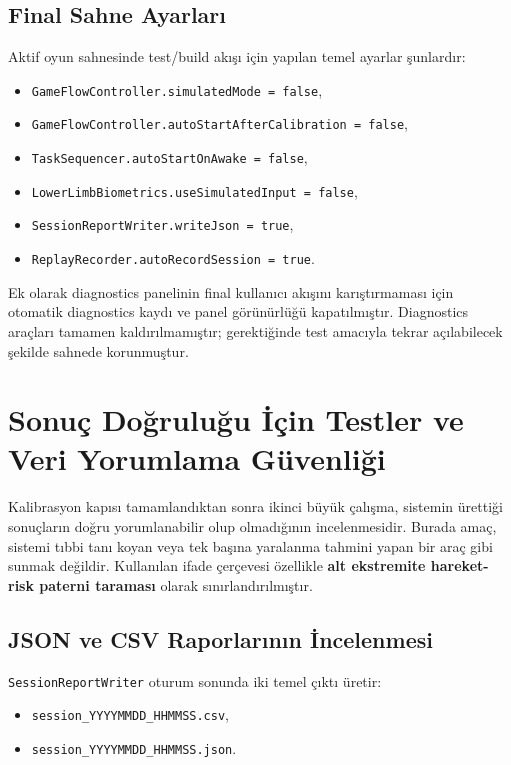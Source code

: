 \documentclass[11pt,a4paper]{article}
\begin{document}
\subsection{Final Sahne Ayarları}

Aktif oyun sahnesinde test/build akışı için yapılan temel ayarlar şunlardır:

\begin{itemize}[nosep]
    \item \texttt{GameFlowController.simulatedMode = false},
    \item \texttt{GameFlowController.autoStartAfterCalibration = false},
    \item \texttt{TaskSequencer.autoStartOnAwake = false},
    \item \texttt{LowerLimbBiometrics.useSimulatedInput = false},
    \item \texttt{SessionReportWriter.writeJson = true},
    \item \texttt{ReplayRecorder.autoRecordSession = true}.
\end{itemize}

Ek olarak diagnostics panelinin final kullanıcı akışını karıştırmaması için
otomatik diagnostics kaydı ve panel görünürlüğü kapatılmıştır. Diagnostics
araçları tamamen kaldırılmamıştır; gerektiğinde test amacıyla tekrar
açılabilecek şekilde sahnede korunmuştur.

\section{Sonuç Doğruluğu İçin Testler ve Veri Yorumlama Güvenliği}
\label{sec:dogrulama}

Kalibrasyon kapısı tamamlandıktan sonra ikinci büyük çalışma, sistemin ürettiği
sonuçların doğru yorumlanabilir olup olmadığının incelenmesidir. Burada amaç,
sistemi tıbbi tanı koyan veya tek başına yaralanma tahmini yapan bir araç gibi
sunmak değildir. Kullanılan ifade çerçevesi özellikle
\textbf{alt ekstremite hareket-risk paterni taraması} olarak sınırlandırılmıştır.

\subsection{JSON ve CSV Raporlarının İncelenmesi}

\texttt{SessionReportWriter} oturum sonunda iki temel çıktı üretir:

\begin{itemize}[nosep]
    \item \texttt{session\_YYYYMMDD\_HHMMSS.csv},
    \item \texttt{session\_YYYYMMDD\_HHMMSS.json}.
\end{itemize}
\end{document}
